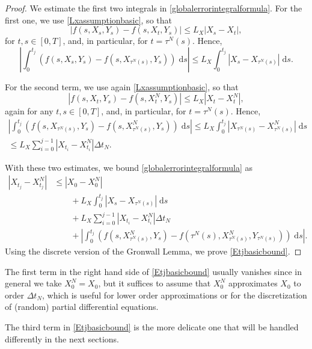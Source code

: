 \documentclass[reqno,12pt]{amsart}
\theoremstyle{plain}%
\theoremstyle{definition}
\begin{document}
\begin{proof}
    We estimate the first two integrals in \eqref{globalerrorintegralformula}. For the first one, we use \eqref{Lxassumptionbasic}, so that
    $$
        |f(s, X_s, Y_s) - f(s, X_t, Y_s)| \leq L_X |X_s - X_t|,
    $$
    for $t, s \in [0, T]$, and, in particular, for $t = \tau^N(s)$. Hence,
    $$
        \left|\int_0^{t_j} \left( f(s, X_s, Y_s) - f(s, X_{\tau^N(s)}, Y_s) \right)\;\mathrm{d}s \right| \leq L_X \int_0^{t_j} |X_s - X_{\tau^N(s)}| \;\mathrm{d}s.
    $$
    
    For the second term, we use again \eqref{Lxassumptionbasic}, so that
    $$
        |f(s, X_t, Y_s) - f(s, X_t^N, Y_s)| \leq L_X |X_t - X_t^N|,
    $$
    again for any $t, s \in [0, T]$, and, in particular, for $t = \tau^N(s)$. Hence,
    \begin{multline*}
        \left|\int_0^{t_j} \left( f(s, X_{\tau^N(s)}, Y_s) - f(s, X_{\tau^N(s)}^N, Y_s) \right)\;\mathrm{d}s \right| \leq L_X \int_0^{t_j} |X_{\tau^N(s)} - X_{\tau^N(s)}^N| \;\mathrm{d}s \\
        \leq L_X\sum_{i=0}^{j-1} |X_{t_i} - X_{t_i}^N|\Delta t_N.
    \end{multline*}
    
    With these two estimates, we bound \eqref{globalerrorintegralformula} as
    \begin{align*}
        |X_{t_j} - X_{t_j}^N| & \leq |X_0 - X_0^N| \\
        & \qquad + L_X \int_0^{t_j} |X_s - X_{\tau^N(s)}| \;\mathrm{d}s  \\ 
        & \qquad + L_X\sum_{i=0}^{j-1} |X_{t_i} - X_{t_i}^N|\Delta t_N \\
        & \qquad + \left|\int_0^{t_j} \left( f(s, X_{\tau^N(s)}^N, Y_s) - f(\tau^N(s), X_{\tau^N(s)}^N, Y_{\tau^N(s)}) \right)\;\mathrm{d}s\right|.
    \end{align*}
    Using the discrete version of the Gronwall Lemma, we prove \eqref{Etjbasicbound}.
\end{proof}

The first term in the right hand side of \eqref{Etjbasicbound} usually vanishes since in general we take $X_0^N = X_0$, but it suffices to assume that $X_0^N$ approximates $X_0$ to order $\Delta t_N$, which is useful for lower order approximations or for the discretization of (random) partial differential equations.

The third term in \eqref{Etjbasicbound} is the more delicate one that will be handled differently in the next sections.
\end{document}
